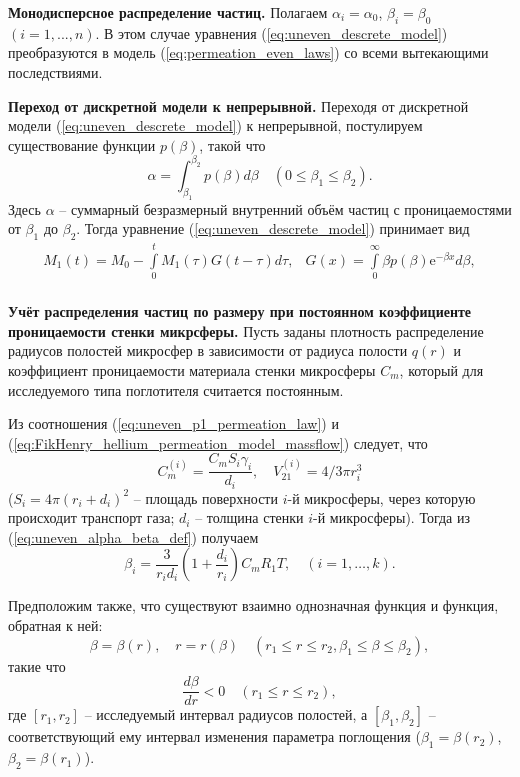 \textbf{Монодисперсное распределение частиц.}
Полагаем $\alpha_i=\alpha_0$, $\beta_i=\beta_0$ $(i=1,...,n)$. В этом случае уравнения (\ref{eq:uneven_descrete_model}) преобразуются в модель (\ref{eq:permeation_even_laws}) со всеми вытекающими последствиями.

\textbf{Переход от дискретной модели к непрерывной.}
Переходя от дискретной модели (\ref{eq:uneven_descrete_model}) к непрерывной, постулируем существование функции $p(\beta)$, такой что 
\begin{equation}
\label{eq:uneven_pbeta_def}
\alpha = \int_{\beta_1}^{\beta_2} p(\beta) d\beta\quad
(0 \leq \beta_1 \leq \beta_2).
\end{equation}
Здесь $\alpha$ -- суммарный безразмерный внутренний объём частиц с проницаемостями от $\beta_1$ до $\beta_2$. Тогда уравнение (\ref{eq:uneven_descrete_model}) принимает вид
\begin{equation}
\label{eq:uneven_cont_model}
\begin{array}{rl}
M_1(t)=M_0-\int\limits_{0}^{t}  M_1(\tau)  G(t-\tau) d\tau, & 
G(x) = \int\limits_{0}^{\infty}\beta p(\beta)  \mathrm{e}^{-\beta x} d\beta,\\
\end{array}
\end{equation}


\textbf{Учёт распределения частиц по размеру при постоянном коэффициенте проницаемости стенки микрсферы.}
Пусть заданы плотность распределение радиусов полостей микросфер в зависимости от радиуса полости $q(r)$ и коэффициент проницаемости материала стенки микросферы $C_m$, который для исследуемого типа поглотителя считается постоянным.

Из соотношения (\ref{eq:uneven_p1_permeation_law}) и (\ref{eq:FikHenry_hellium_permeation_model_massflow}) следует, что
\begin{equation*}
\label{eq:uneven_Cmi_V21i_def}
C_m^{(i)} = \frac{C_m S_i \gamma_i}{d_i}, \quad V_{21}^{(i)} = 4/3\pi r_i^3
\end{equation*}
($S_i=4 \pi (r_i+d_i)^2$ -- площадь поверхности $i$-й микросферы, через которую происходит транспорт газа; $d_i$ -- толщина стенки $i$-й микросферы). Тогда из (\ref{eq:uneven_alpha_beta_def}) получаем
\begin{equation}
\label{eq:uneven_beta_reduction}
\beta_i = \frac{3}{r_i d_i} \left(1+\displaystyle\frac{d_i}{r_i}\right)  C_m R_1 T, \quad (i=1,\ldots, k).
\end{equation}

Предположим также, что существуют взаимно однозначная функция и функция, обратная к ней:
\begin{equation*}
\label{eq:uneven_betar_con}
\beta = \beta(r), \quad r=r(\beta) \quad (r_1 \leq r \leq r_2, \beta_1 \leq \beta \leq \beta_2),
\end{equation*}
такие что 
\[
\frac{d\beta}{dr} < 0 \quad (r_1 \leq r \leq r_2),
\]
где $[r_1, r_2]$ -- исследуемый интервал радиусов полостей, а $[\beta_1, \beta_2]$ -- соответствующий ему интервал изменения параметра поглощения ($\beta_1=\beta(r_2)$, $\beta_2 = \beta(r_1)$).

